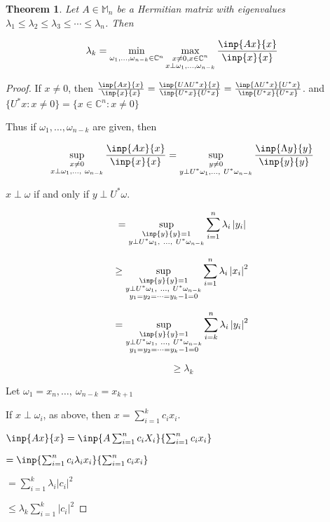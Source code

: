 \documentclass[twofold]{article}
\newcommand*\adj[1]{#1^*}
\newcommand*\abs[1]{\left \vert #1 \right\vert}
\theoremstyle{plain}
\newtheorem{theorem}{Theorem}
\theoremstyle{definition}
\theoremstyle{remark}
\begin{document}
\begin{theorem} Let \(A \in \mathbb{M}_n\) be a Hermitian matrix with eigenvalues \(\lambda_1 \le \lambda_2 \le \lambda_3 \le \cdots \le \lambda_n\). Then 

  \[ \lambda_k = \min_{\omega_1, \ldots , \omega_{n-k} \in \mathbb{C}^n} \max_{\substack{x \neq 0, x\in \mathbb{C}^n \\ x \perp \omega_1, \ldots , \omega_{n-k}}} \frac{\inp{Ax}{x}}{\inp{x}{x}}\]

 \end{theorem}




\begin{proof} If \(x \neq 0\), then \(\frac{\inp{Ax}{x}}{\inp{x}{x}} = \frac{\inp{U \Lambda \adj{U} x}{x}}{\inp{\adj{U} x}{ \adj{U} x}} \\
 = \frac{\inp{\Lambda \adj{U} x}{ \adj{U} x}}{\inp{\adj{U}x}{\adj{U}x}}\). and \( \{ \adj{U} x : x \neq 0\}  = \{ x \in \mathbb{C}^n : x \neq 0 \}\) 



Thus if \(\omega_1, \ldots , \omega_{n-k}\) are given, then 

\[ \sup_{\substack{x \neq 0 \\ x \perp \omega_1, \ldots, \ \omega_{n-k}}} \frac{\inp{Ax}{x}}{\inp{x}{x}} = \sup_{\substack{y \neq 0 \\ y \perp \adj{U}\omega_1, \ldots ,\ \adj{U} \omega_{n-k}}} \frac{\inp{\Lambda y}{y}}{\inp{y}{y}}\]

\(x \perp \omega\) if and only if \(y \perp \adj{U} \omega\). 

\[ = \sup_{\substack{\inp{y}{y} = 1 \\ y \perp \adj{U} \omega_1, \ \ldots , \ \adj{U}\omega_{n-k}}} \sum_{i = 1}^n \lambda_i \abs{y_i}\]

\[ \ge \sup_{\substack{\inp{y}{y} = 1 \\ y \perp \adj{U} \omega_1, \ \ldots , \ \adj{U}\omega_{n-k} \\ y_1 = y_2 = \cdots = y_k-1 = 0 }} \sum_{i = 1}^n \lambda_i \abs{x_i}^2\]

\[ = \sup_{\substack{\inp{y}{y} = 1 \\ y \perp \adj{U} \omega_1, \ \ldots , \ \adj{U}\omega_{n-k} \\ y_1 = y_2 = \cdots = y_k-1 = 0 }} \sum_{i = k}^n \lambda_i \abs{y_i}^2\]

\[ \ge \lambda_k \]


Let \(\omega_1 = x_n , \ldots , \ \omega_{n-k} = x_{k + 1}\)

If \(x\perp \omega_i\), as above, then \(x = \sum_{i = 1} ^k c_i x_i\). 

\(\inp{Ax}{x} = \inp{A \sum_{i = 1} ^ n c_i X_i}{ \sum_{i = 1} ^n c_i x_i}\)

\( = \inp{\sum_{i = 1} ^n c_i \lambda_i x_i}{\sum_{i = 1} ^n c_i x_i}\)

\(= \sum_{i = 1} ^ k \lambda_i \abs{c_i}^2\) 

\( \le \lambda_k \sum_{i = 1} ^{k} \abs{c_i}^2\)


\end{proof}
\end{document}
